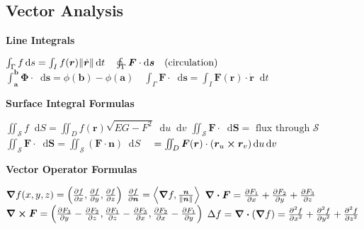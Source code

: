 \documentclass[10pt, a4paper]{article}
\newcommand*\diff{\mathop{}\!\mathrm{d}} %
\begin{document}
\begin{multicols}{2}
\section*{Vector Analysis} \vspace{-3mm}

\textbf{Line Integrals}	\vspace{1mm} 

$ \int_{\Gamma} f \diff s = \int_I f(\bm{r})  \norm{\dot{\bm{r}}} \diff t \quad \oint_{\Gamma} \bm{F} \cdot \diff \bm{s} \quad \text{(circulation)} $ \newline
$ \int_{\bm{a}}^{\bm{b}} \bm{\Phi} \cdot \diff \bm{s} = \phi(\bm{b}) - \phi(\bm{a}) \quad \int_{\Gamma} \bm{F} \cdot \diff \bm{s} = \int_I \bm{F}(\bm{r}) \cdot \dot{\bm{r}} \diff t $
\vspace{2mm}

\textbf{Surface Integral Formulas} 	\vspace{1mm} 

$ \iint_{\mathcal{S}} f \diff S = \iint_D f(\bm{r})  \sqrt{EG - F^2}  \diff u \diff v $ \vspace{1mm} \newline
$ \iint_{\mathcal{S}} \bm{F} \cdot \diff \bm{S} = \text{ flux through }  \mathcal{S}$ \vspace{1mm} \newline
$\iint_{\mathcal{S}} \bm{F} \cdot \diff \bm{S} = \iint_{\mathcal{S}} (\bm{F} \cdot \bm{n} )\diff S $ \vspace{1mm} \newline
$ \quad = \iint_D \bm{F}(\bm{r}) \cdot (\bm{r}_u \cross \bm{r}_v)  \diff u \diff v  $
\vspace{2mm}

\textbf{Vector Operator Formulas}

\vspace{1mm}
$ \grad{f}(x, y, z) = \left( \pdv{f}{x},  \pdv{f}{y},  \pdv{f}{z}  \right) $\vspace{0.5mm}\newline
$ \pdv{f}{\bm{n}} = \expval{\grad{f},\frac{ \bm{n}}{\norm{\bm{n}}}} $\vspace{0.5mm}\newline
$ \div{\bm{F}} = \pdv{F_1}{x} + \pdv{F_2}{y} + \pdv{F_3}{z} $\vspace{0.5mm}\newline
$ \curl{\bm{F}} = \left( \pdv{F_3}{y} - \pdv{F_2}{z}, \pdv{F_1}{z} - \pdv{F_3}{x} , \pdv{F_2}{x} - \pdv{F_1}{y}  \right) $\vspace{0.5mm}\newline
$ \Delta f = \div(\grad f) = \pdv[2]{f}{x} + \pdv[2]{f}{y} + \pdv[2]{f}{z} $
\vspace{2mm}


\end{multicols}
\end{document}

